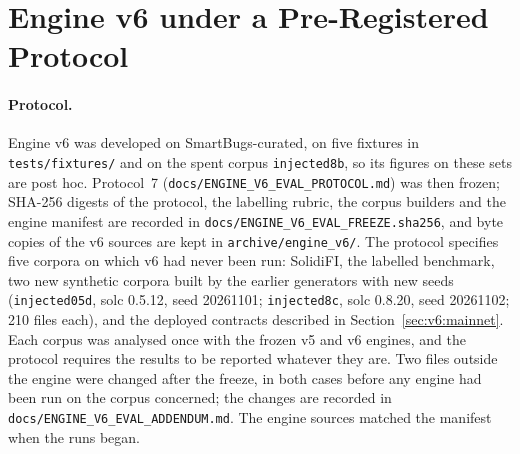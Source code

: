 \documentclass[pdflatex,sn-mathphys]{sn-jnl}
\theoremstyle{thmstyletwo}
\theoremstyle{thmstyletwo}
\begin{document}
\section{Engine v6 under a Pre-Registered Protocol}\label{sec:v6}

\paragraph{Protocol.} Engine v6 was developed on SmartBugs-curated, on five fixtures in \texttt{tests/fixtures/} and on the spent corpus \texttt{injected8b}, so its figures on these sets are post hoc. Protocol~7 (\texttt{docs/ENGINE\_V6\_EVAL\_PROTOCOL.md}) was then frozen; SHA-256 digests of the protocol, the labelling rubric, the corpus builders and the engine manifest are recorded in \texttt{docs/ENGINE\_V6\_EVAL\_FREEZE.sha256}, and byte copies of the v6 sources are kept in \texttt{archive/engine\_v6/}. The protocol specifies five corpora on which v6 had never been run: SolidiFI, the labelled benchmark, two new synthetic corpora built by the earlier generators with new seeds (\texttt{injected05d}, solc 0.5.12, seed 20261101; \texttt{injected8c}, solc 0.8.20, seed 20261102; 210 files each), and the deployed contracts described in Section~\ref{sec:v6:mainnet}. Each corpus was analysed once with the frozen v5 and v6 engines, and the protocol requires the results to be reported whatever they are. Two files outside the engine were changed after the freeze, in both cases before any engine had been run on the corpus concerned; the changes are recorded in \texttt{docs/ENGINE\_V6\_EVAL\_ADDENDUM.md}. The engine sources matched the manifest when the runs began.
\end{document}
